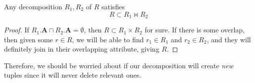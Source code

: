   \begin{theorem}[Decomposition]
    \label{thm:decomposition}
    Any decomposition $R_1, R_2$ of $R$ satisfies 
    \begin{equation}
      R \subset R_1 \bowtie R_2
    \end{equation}
  \end{theorem} 
  \begin{proof}
    If $R_1.\mathbf{A} \cap R_2.\mathbf{A} = \emptyset$, then $R \subset R_1 \times R_2$ for sure. If there is some overlap, then given some $r \in R$, we will be able to find $r_1 \in R_1$ and $r_2 \in R_2$, and they will definitely join in their overlapping attribute, giving $R$. 
  \end{proof}

  Therefore, we should be worried about if our decomposition will create \textit{new} tuples since it will never delete relevant ones.

